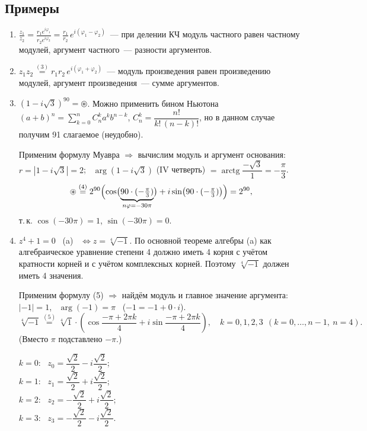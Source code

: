 \documentclass[a4paper,11pt]{article}
\newcommand{\rarctg}{\operatorname{arctg}}
\begin{document}
\subsection{Примеры}
\begin{enumerate}[label=\arabic*.]
\item $\displaystyle\frac{z_1}{z_2}=\frac{r_1e^{i\varphi_1}}{r_2e^{i\varphi_2}}=\frac{r_1}{r_2}\,e^{i(\varphi_1-\varphi_2)}$~---
при делении КЧ модуль частного равен частному модулей, аргумент частного~--- разности
аргументов.
\item $z_1z_2\overset{(3)}{=}r_1r_2\,e^{i(\varphi_1+\varphi_2)}$~--- модуль произведения равен
произведению модулей, аргумент произведения~--- сумме аргументов.
\item $(1-i\sqrt3)^{90}=\circledast$. Можно применить бином Ньютона
$(a+b)^n=\sum\limits_{k=0}^{n}C_n^ka^kb^{n-k}$, $C_n^k=\dfrac{n!}{k!\,(n-k)!}$, но в данном случае
получим 91 слагаемое (неудобно).

Применим формулу Муавра $\Rightarrow$ вычислим модуль и аргумент основания:
$r=|1-i\sqrt3|=2$; \ $\arg(1-i\sqrt3)$ (IV четверть) $=\rarctg\dfrac{-\sqrt3}{1}=-\dfrac\pi3$.
\[
\circledast\overset{(4)}{=}2^{90}\Bigl(\cos\bigl(\underbrace{90\cdot(-\tfrac\pi3)}_{n\varphi=-30\pi}\bigr)
+i\sin\bigl(90\cdot(-\tfrac\pi3)\bigr)\Bigr)=2^{90},
\]
т.\,к. $\cos(-30\pi)=1$, $\sin(-30\pi)=0$.

\item $z^4+1=0$ \ (a) \ $\iff z=\sqrt[4]{-1}$. По основной теореме алгебры (a) как алгебраическое
уравнение степени 4 должно иметь 4 корня с учётом кратности корней и с учётом комплексных корней.
Поэтому $\sqrt[4]{-1}$ должен иметь 4 значения.

Применим формулу (5) $\Rightarrow$ найдём модуль и главное значение аргумента:
$|-1|=1$, \ $\arg(-1)=\pi$ \ ($-1=-1+0\cdot i$).
\[
\sqrt[4]{-1}\overset{(5)}{=}\sqrt[4]1\cdot\left(\cos\frac{-\pi+2\pi k}{4}+i\sin\frac{-\pi+2\pi k}{4}\right),
\quad k=0,1,2,3\ \ (k=0,\dots,n-1,\ n=4).
\]
(Вместо $\pi$ подставлено $-\pi$.)

\begin{minipage}[c]{0.5\linewidth}
$k=0$: \ $z_0=\dfrac{\sqrt2}{2}-i\dfrac{\sqrt2}{2}$;\\[3pt]
$k=1$: \ $z_1=\dfrac{\sqrt2}{2}+i\dfrac{\sqrt2}{2}$;\\[3pt]
$k=2$: \ $z_2=-\dfrac{\sqrt2}{2}+i\dfrac{\sqrt2}{2}$;\\[3pt]
$k=3$: \ $z_3=-\dfrac{\sqrt2}{2}-i\dfrac{\sqrt2}{2}$.


\end{minipage}
\end{enumerate}
\end{document}
